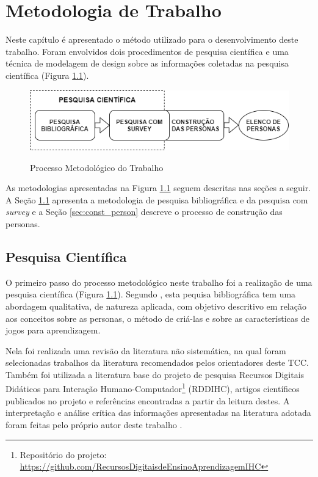 \chapter{Metodologia de Trabalho}
\label{chap:Metodo}

Neste capítulo é apresentado o método utilizado para o desenvolvimento deste trabalho. Foram envolvidos dois procedimentos de pesquisa científica e uma técnica de modelagem de design sobre as informações coletadas na pesquisa científica (Figura \ref{Fig:geral_flow.png}).

\begin{figure}[htbp]
	\centering
	\caption{Processo Metodológico do Trabalho}
	\includegraphics[keepaspectratio=true,scale=0.6]{figuras/metodologia/fluxo geral.png}
	\label{Fig:geral_flow.png}
\end{figure}

As metodologias apresentadas na Figura \ref{Fig:geral_flow.png} seguem descritas nas seções a seguir. A Seção \ref{sec:pesq_cient} apresenta a metodologia de pesquisa bibliográfica e da pesquisa com \textit{survey} e a Seção \ref{sec:const_person} descreve o processo de construção das personas. 


\section{Pesquisa Científica} 
\label{sec:pesq_cient}

O primeiro passo do processo metodológico neste trabalho foi a realização de uma pesquisa científica (Figura \ref{Fig:geral_flow.png}). Segundo , esta pequisa bibliográfica tem uma abordagem qualitativa, de natureza aplicada, com objetivo descritivo em relação aos conceitos sobre as personas, o método de criá-las e sobre as características de jogos para aprendizagem.

Nela foi realizada uma revisão da literatura não sistemática, na qual foram selecionadas trabalhos da literatura \cite{barbosa_silva, BarbosaEtAl2021, cooper07} recomendados pelos orientadores deste TCC. Também foi utilizada a literatura base do projeto de pesquisa Recursos Digitais Didáticos para Interação Humano-Computador\footnote{Repositório do projeto: \url{https://github.com/RecursosDigitaisdeEnsinoAprendizagemIHC}} (RDDIHC), artigos científicos publicados no projeto \cite{deSales_SousaeSilva_2020, silva_sales_mendes2021} e referências encontradas a partir da leitura destes. A interpretação e análise crítica das informações apresentadas na literatura adotada foram feitas pelo próprio autor deste trabalho \cite{ROTHER2007}. 

